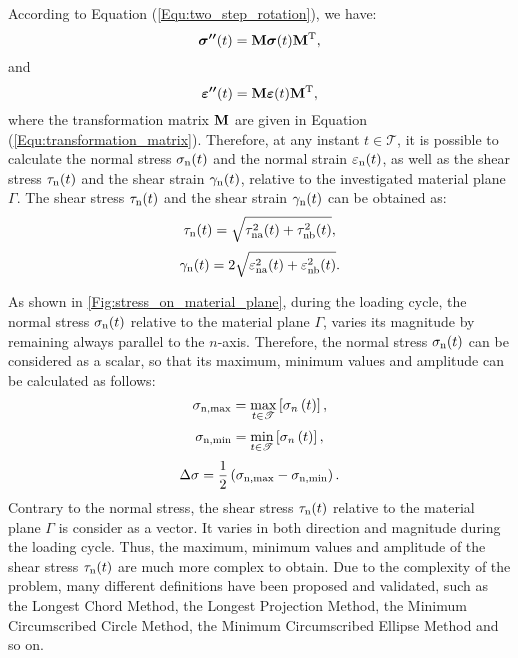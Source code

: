 According to Equation (\ref{Equ:two_step_rotation}), we have:
\begin{equation}
{\bm{\sigma ''}}(t) = {\bf{M}}{\bm{\sigma}}(t){{\bf{M}}^{\rm{T}}},
\end{equation}
and
\begin{equation}
{\bm{\varepsilon ''}}(t) = {\bf{M}}{\bm{\varepsilon}}(t){{\bf{M}}^{\rm{T}}},
\end{equation}
where the transformation matrix ${\bf{M}}$ are given in Equation (\ref{Equ:transformation_matrix}).
Therefore, at any instant $t \in \mathscr{T}$, it is possible to calculate the normal stress ${{\sigma _{{\rm{n}}}}(t)}$ and the normal strain ${{\varepsilon _{{\rm{n}}}}(t)}$, as well as the shear stress ${{\tau _{{\rm{n}}}}(t)}$ and the shear strain ${{\gamma _{{\rm{n}}}}(t)}$, relative to the investigated material plane $\Gamma$. The shear stress ${{\tau _{{\rm{n}}}}(t)}$ and the shear strain ${{\gamma _{{\rm{n}}}}(t)}$ can be obtained as:
\begin{equation}
{{\tau _{{\rm{n}}}}(t)} = \sqrt{{{\tau^2_{{\rm{na}}}}(t)}+{{\tau^2_{{\rm{nb}}}}(t)}},
\end{equation}
\begin{equation}
{{\gamma _{{\rm{n}}}}(t)} = 2 \sqrt{{{\varepsilon^2_{{\rm{na}}}}(t)}+{{\varepsilon^2_{{\rm{nb}}}}(t)}}.
\end{equation}

As shown in \ref{Fig:stress_on_material_plane}, during the loading cycle, the normal stress ${{\sigma _{{\rm{n}}}}(t)}$ relative to the material plane $\Gamma$, varies its magnitude by remaining always parallel to the $n$-axis. Therefore, the normal stress ${{\sigma _{{\rm{n}}}}(t)}$ can be considered as a scalar, so that its maximum, minimum values and amplitude can be calculated as follows:
\begin{equation}
{\sigma _{{\rm{n,max}}}} = \mathop {\max }\limits_{t \in \mathscr{T}} \left[ {{\sigma _n}\left( t \right)} \right],
\end{equation}
\begin{equation}
{\sigma _{{\rm{n,min}}}} = \mathop {\min }\limits_{t \in \mathscr{T}} \left[ {{\sigma _n}\left( t \right)} \right],
\end{equation}
\begin{equation}
\Delta \sigma  = \frac{1}{2}\left( {{\sigma _{{\rm{n,max}}}} - {\sigma _{{\rm{n,min}}}}} \right).
\end{equation}
Contrary to the normal stress, the shear stress ${{\tau _{{\rm{n}}}}(t)}$ relative to the material plane $\Gamma$ is consider as a vector. It varies in both direction and magnitude during the loading cycle. 
Thus, the maximum, minimum values and amplitude of the shear stress ${{\tau _{{\rm{n}}}}(t)}$ are much more complex to obtain. 
Due to the complexity of the problem, many different definitions have been proposed and validated, such as the Longest Chord Method\cite{Lemaitre1990Mechanics}, the Longest Projection Method, the Minimum Circumscribed Circle Method, the Minimum Circumscribed Ellipse Method and so on. 

